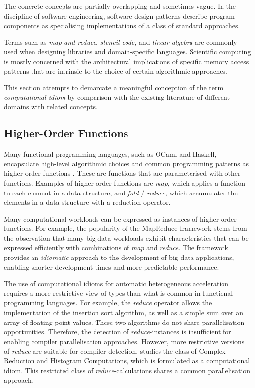     The concrete concepts are partially overlapping and sometimes vague.
    In the discipline of software engineering, software design patterns
    describe program components as specialising implementations of
    a class of standard approaches.

    Terms such as {\em map and reduce}, {\em stencil code}, and
    {\em linear algebra} are commonly used when designing libraries and
    domain-specific languages.
    Scientific computing is mostly concerned with the architectural
    implications of specific memory access patterns that are intrinsic to
    the choice of certain algorithmic approaches.

    This section attempts to demarcate a meaningful conception of the term
    {\it computational idiom} by comparison with the existing literature of
    different domains with related concepts.

\subsection{Higher-Order Functions}

    Many functional programming languages, such as OCaml and Haskell,
    encapsulate high-level algorithmic choices and common programming patterns
    as higher-order functions \citep{Hughes:1989:WFP:63410.63411}.
    These are functions that are parameterised with other functions.
    Examples of higher-order functions are {\it map}, which applies a function
    to each element in a data structure, and {\it fold} / {\it reduce}, which
    accumulates the elements in a data structure with a reduction operator.

    Many computational workloads can be expressed as instances of
    higher-order functions.
    For example, the popularity of the MapReduce framework
    \citep{Dean2008MapReduce} stems from the observation that many big data
    workloads exhibit characteristics that can be expressed efficiently with
    combinations of {\it map} and {\it reduce}.
    The framework provides an {\em idiomatic} approach to the development of big
    data applications, enabling shorter development times and more predictable
    performance.

    The use of computational idioms for automatic heterogeneous acceleration
    requires a more restrictive view of types than what is common in
    functional programming languages.
    For example, the {\it reduce} operator allows the implementation of
    the insertion sort algorithm, as well as a simple sum over an array of
    floating-point values.
    These two algorithms do not share parallelisation opportunities.
    Therefore, the detection of {\it reduce}-instances is insufficient for
    enabling compiler parallelisation approaches.
    However, more restrictive versions of {\it reduce} are suitable for
    compiler detection.
     studies the class of Complex Reduction and
    Histogram Computations, which is formulated as a computational idiom.
    This restricted class of {\it reduce}-calculations shares a common
    parallelisation approach.

